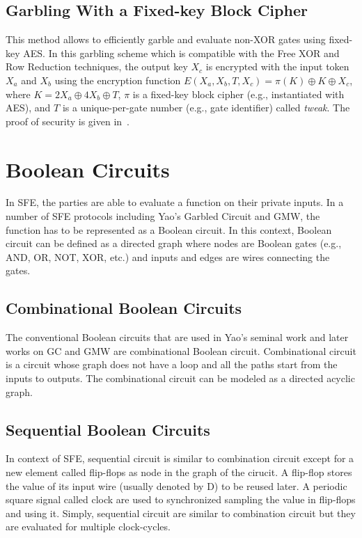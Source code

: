 \subsection{Garbling With a Fixed-key Block Cipher~\cite{bellare2013efficient}}
This method allows to efficiently garble and evaluate non-XOR gates using fixed-key AES.
In this garbling scheme which is compatible with the Free XOR and Row Reduction techniques, the output key $X_{c}$ is encrypted with the input token $X_{a}$ and $X_{b}$ using the encryption function $E(X_a,X_b,T,X_c) = \pi(K) \oplus K \oplus X_c$, where $K=2X_a\oplus4X_b\oplus T$, $\pi$ is a fixed-key block cipher (e.g., instantiated with AES), and $T$ is a unique-per-gate number (e.g., gate identifier) called \emph{tweak}.
The proof of security is given in~\cite{bellare2013efficient}.

\section{Boolean Circuits}
In SFE, the parties are able to evaluate a function on their private inputs.
In a number of SFE protocols including Yao's Garbled Circuit and GMW, the function has to be represented as a Boolean circuit.
In this context, Boolean circuit can be defined as a directed graph where nodes are Boolean gates (e.g., AND, OR, NOT, XOR, etc.) and inputs and edges are wires connecting the gates.

\subsection{Combinational Boolean Circuits}
The conventional Boolean circuits that are used in Yao's seminal work and later works on GC and GMW are combinational Boolean circuit.
Combinational circuit is a circuit whose graph does not have a loop and all the paths start from the inputs to outputs.
The combinational circuit can be modeled as a directed acyclic graph.

\subsection{Sequential Boolean Circuits}
In context of SFE, sequential circuit is similar to combination circuit except for a new element called flip-flops as node in the graph of the cirucit.
A flip-flop stores the value of its input wire (usually denoted by D) to be reused later.
A periodic square signal called clock are used to synchronized sampling the value in flip-flops and using it.
Simply, sequential circuit are similar to combination circuit but they are evaluated for multiple clock-cycles.
